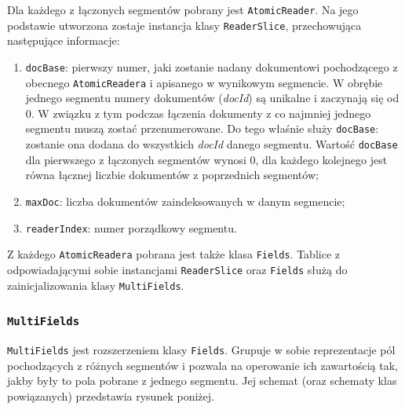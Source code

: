 Dla każdego z łączonych segmentów pobrany jest \texttt{AtomicReader}. Na jego podstawie utworzona zostaje instancja klasy \texttt{ReaderSlice}, przechowująca następujące informacje:
\begin{enumerate}
 \item \texttt{docBase}: pierwszy numer, jaki zostanie nadany dokumentowi pochodzącego z obecnego \texttt{AtomicReadera} i apisanego w wynikowym segmencie. W obrębie jednego segmentu numery dokumentów (\emph{docId}) są unikalne i zaczynają się od 0. W związku z tym podczas łączenia dokumenty z co najmniej jednego segmentu muszą zostać przenumerowane. Do tego właśnie służy \texttt{docBase}: zostanie ona dodana do wszystkich \emph{docId} danego segmentu. Wartość \texttt{docBase} dla pierwszego z łączonych segmentów wynosi 0, dla każdego kolejnego jest równa łącznej liczbie dokumentów z poprzednich segmentów;
 \item \texttt{maxDoc}: liczba dokumentów zaindeksowanych w danym segmencie;
 \item \texttt{readerIndex}: numer porządkowy segmentu.
\end{enumerate}

Z każdego \texttt{AtomicReadera} pobrana jest także klasa \texttt{Fields}. Tablice z odpowiadającymi sobie instancjami \texttt{ReaderSlice} oraz \texttt{Fields} służą do zainicjalizowania klasy \texttt{MultiFields}.

\subsubsection{\texttt{MultiFields}}

\texttt{MultiFields} jest rozszerzeniem klasy \texttt{Fields}. Grupuje w sobie reprezentacje pól pochodzących z różnych segmentów i pozwala na operowanie ich zawartością tak, jakby były to pola pobrane z jednego segmentu. Jej schemat (oraz schematy klas powiązanych) przedstawia rysunek poniżej.

